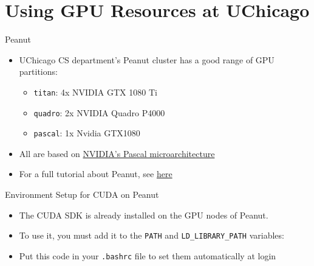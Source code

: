 \documentclass{beamer}
\begin{document}
    \section{Using GPU Resources at UChicago}

    \begin{frame}{Peanut}
        \begin{itemize}
            \item UChicago CS department's Peanut cluster has a good range of GPU partitions:
            \begin{itemize}
                \item \texttt{titan}: 4x NVIDIA GTX 1080 Ti
                \item \texttt{quadro}: 2x NVIDIA Quadro P4000
                \item \texttt{pascal}: 1x Nvidia GTX1080
            \end{itemize}
            \item All are based on \href{https://en.wikipedia.org/wiki/Pascal_(microarchitecture)}{NVIDIA's Pascal microarchitecture}
            \item For a full tutorial about Peanut, see \href{https://paper.dropbox.com/doc/MPCS-51087-Peanut-Guide--BEH4QScOO4aUHCdYBIXHJTuOAQ-H2Qv2MChSshxwVqF7cuFH}{here}
        \end{itemize}
    \end{frame}

    \begin{frame}{Environment Setup for CUDA on Peanut}
        \begin{itemize}
            \item The CUDA SDK is already installed on the GPU nodes of Peanut.
            \item To use it, you must add it to the \texttt{PATH} and \texttt{LD\_LIBRARY\_PATH} variables:
            \item Put this code in your \texttt{.bashrc} file to set them automatically at login
            \begin{block}{}
                \inputminted{bash}{src/cuda_rc.sh}
            \end{block}
        \end{itemize}
    \end{frame}
\end{document}
